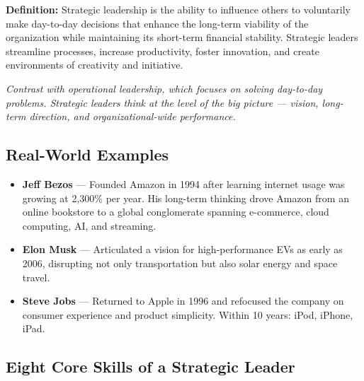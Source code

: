 \documentclass[11pt, letterpaper]{article}
\begin{document}
\begin{defbox}
\textbf{Definition:} Strategic leadership is the ability to influence others to voluntarily make day-to-day decisions that enhance the long-term viability of the organization while maintaining its short-term financial stability. Strategic leaders streamline processes, increase productivity, foster innovation, and create environments of creativity and initiative.
\end{defbox}

\textit{Contrast with operational leadership, which focuses on solving day-to-day problems. Strategic leaders think at the level of the big picture --- vision, long-term direction, and organizational-wide performance.}

\subsection{Real-World Examples}

\begin{itemize}[leftmargin=*]
  \item \textbf{Jeff Bezos} --- Founded Amazon in 1994 after learning internet usage was growing at 2,300\% per year. His long-term thinking drove Amazon from an online bookstore to a global conglomerate spanning e-commerce, cloud computing, AI, and streaming.
  \item \textbf{Elon Musk} --- Articulated a vision for high-performance EVs as early as 2006, disrupting not only transportation but also solar energy and space travel.
  \item \textbf{Steve Jobs} --- Returned to Apple in 1996 and refocused the company on consumer experience and product simplicity. Within 10 years: iPod, iPhone, iPad.
\end{itemize}

\subsection{Eight Core Skills of a Strategic Leader}
\end{document}
